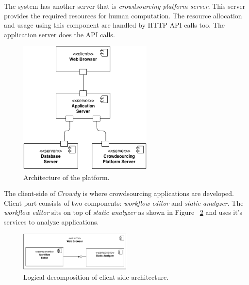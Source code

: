 The system has another server that is \textit{crowdsourcing platform server}. This 
server provides the required resources for human computation. The resource 
allocation and usage using this component are handled by HTTP API calls too. 
The application server does the API calls.


\begin{figure}[ht]
	\centering
	\includegraphics[width=0.6\textwidth]{figures/architecture/CC1.png}
	\caption{Architecture of the platform.}
	\label{fig:arch}
\end{figure}

The client-side of $Crowdy$ is where crowdsourcing applications are developed. Client 
part consists of two components: \textit{workflow editor} and \textit{static analyzer}. The 
\textit{workflow editor} sits on top of \textit{static analyzer} as shown in Figure
~\ref{fig:clientdecomposition} and uses it's services to analyze applications.

\begin{figure}[ht]
	\centering
	\includegraphics[width=0.5\textwidth]{figures/architecture/CC2.png}
	\caption{Logical decomposition of client-side architecture.}
	\label{fig:clientdecomposition}
\end{figure}

